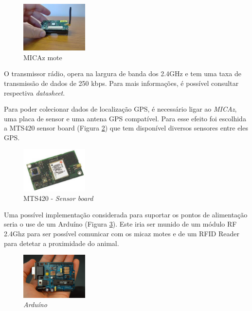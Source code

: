 \documentclass[times,10pt,twocolumn]{article}
\begin{document}
\begin{figure}[h]
	\centering
	\includegraphics[width=0.3\textwidth]{micaz.jpeg}	
	\caption{MICAz mote}
	\label{fig:micaz}
\end{figure}

O transmissor rádio, opera na largura de banda dos 2.4GHz e tem uma taxa de transmissão de dados de 250 kbps. Para mais informações, é possível consultar respectiva \textit{datasheet}\cite{micaz}.


Para poder colecionar dados de localização GPS, é necessário ligar ao \textit{MICAz}, uma placa de sensor e uma antena GPS compatível. Para esse efeito foi escolhida a MTS420 sensor board (Figura \ref{fig:mts420}) que tem disponível diversos sensores entre eles GPS.  

\begin{figure}[h]
	\centering
	\includegraphics[width=0.30\textwidth]{Mts420.jpg}	
	\caption{MTS420 - \textit{Sensor board}}
	\label{fig:mts420}
\end{figure}

Uma possível implementação considerada para suportar os pontos de alimentação seria o use de um Arduíno (Figura \ref{fig:ard}). Este iria ser munido de um módulo RF 2.4Ghz para ser possível comunicar com os micaz motes e de um RFID Reader para detetar a proximidade do animal. 

\begin{figure}[h]
	\centering
	\includegraphics[width=0.30\textwidth]{ard.jpg}	
	\caption{\textit{Arduíno}}
	\label{fig:ard}
\end{figure}
\end{document}
